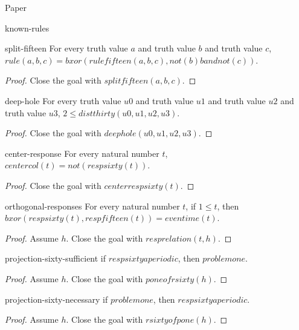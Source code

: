 \begin{lexlean}{Paper}
\begin{section}{known-rules}
  \begin{theorem}{split-fifteen}
  For every truth value \(a\) and truth value \(b\) and truth value \(c\), \(rule(a, b, c) = bxor(rulefifteen(a, b, c), not(b) band not(c))\).
  \begin{proof}
  Close the goal with \(splitfifteen(a, b, c)\).
  \end{proof}
  \end{theorem}

  \begin{theorem}{deep-hole}
  For every truth value \(u0\) and truth value \(u1\) and truth value \(u2\) and truth value \(u3\), \(2 ≤ distthirty(u0, u1, u2, u3)\).
  \begin{proof}
  Close the goal with \(deephole(u0, u1, u2, u3)\).
  \end{proof}
  \end{theorem}

  \begin{theorem}{center-response}
  For every natural number \(t\), \(centercol(t) = not(respsixty(t))\).
  \begin{proof}
  Close the goal with \(centerrespsixty(t)\).
  \end{proof}
  \end{theorem}

  \begin{theorem}{orthogonal-responses}
  For every natural number \(t\), if \(1 ≤ t\), then \(bxor(respsixty(t), respfifteen(t)) = eventime(t)\).
  \begin{proof}
  Assume \(h\).
  Close the goal with \(resprelation(t, h)\).
  \end{proof}
  \end{theorem}

  \begin{theorem}{projection-sixty-sufficient}
  if \(respsixtyaperiodic\), then \(problemone\).
  \begin{proof}
  Assume \(h\).
  Close the goal with \(poneofrsixty(h)\).
  \end{proof}
  \end{theorem}

  \begin{theorem}{projection-sixty-necessary}
  if \(problemone\), then \(respsixtyaperiodic\).
  \begin{proof}
  Assume \(h\).
  Close the goal with \(rsixtyofpone(h)\).
  \end{proof}
  \end{theorem}


\end{section}
\end{lexlean}
